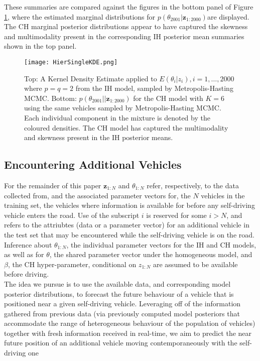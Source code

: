 \documentclass[12pt,a4paper]{article}\usepackage[]{graphicx}\usepackage[]{color}
\begin{document}
These summaries are compared against the figures in the bottom panel of Figure \ref{fig:HierSingleKDE}, where the estimated marginal distributions for $p(\theta_{2001} | \textbf{z}_{1:2000})$are displayed. The CH marginal posterior distributions appear to have captured the skewness and multimodality present in the corresponding IH posterior mean summaries shown in the top panel. 
\begin{figure}[ht]
\centering
\texttt{[image: HierSingleKDE.png]}
\caption{Top: A Kernel Density Estimate applied to $E(\theta_i | z_i), i = 1, \dots, 2000$ where $p = q = 2$ from the IH model, sampled by Metropolis-Hasting MCMC. Bottom: $p(\theta_{2001}| | \textbf{z}_{1:2000})$ for the CH model with $K = 6$ using the same vehicles sampled by Metropolis-Hasting MCMC. Each individual component in the mixture is denoted by the coloured densities. The CH model has captured the multimodality and skewness present in the IH posterior means.}
\label{fig:HierSingleKDE}
\end{figure}

\subsection{Encountering Additional Vehicles}
\label{subsec:additionalVehicles}

For the remainder of this paper $\textbf{z}_{1:N}$ and $\theta_{1:N}$ refer, respectively, to the data collected from, and the associated parameter vectors for, the $N$ vehicles in the training set, the vehicles where information is available for before any self-driving vehicle enters the road. Use of the subscript $i$ is reserved for some $i > N$, and refers to the attriubtes (data or a parameter vector) for an additional vehicle in the test set that may be encountered while the self-driving vehicle is on the road. Inference about $\theta_{1:N}$, the individual parameter vectors for the IH and CH models, as well as for $\theta$, the shared parameter vector under the homogeneous model, and $\beta$, the CH hyper-parameter, conditional on $z_{1:N}$ are assumed to be available before driving.
\\

The idea we pursue is to use the available data, and corresponding model posterior distributions, to forecast the future behaviour of a vehicle that is positioned near a given self-driving vehicle. Leveraging off of the information gathered from previous data (via previously computed model posteriors that accommodate the range of heterogeneous behaviour of the population of vehicles) together with fresh information received in real-time, we aim to predict the near future position of an additional vehicle moving contemporaneously with the self-driving one
\\
\end{document}

